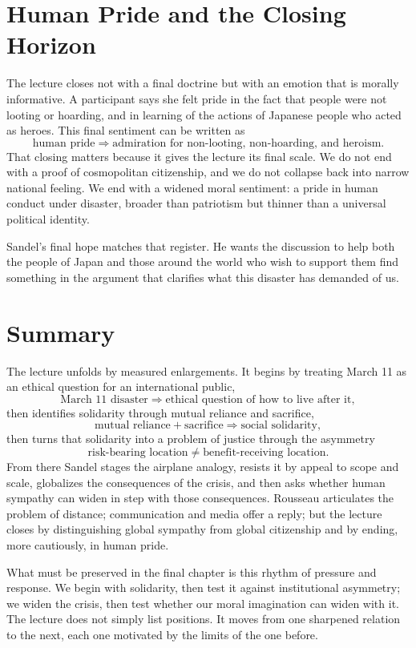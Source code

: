 \section{Human Pride and the Closing Horizon}

The lecture closes not with a final doctrine but with an emotion that is morally informative. A participant says she felt pride in the fact that people were not looting or hoarding, and in learning of the actions of Japanese people who acted as heroes. This final sentiment can be written as
\begin{equation}
\text{human pride}
\Longrightarrow
\text{admiration for non-looting, non-hoarding, and heroism}.
\end{equation}
That closing matters because it gives the lecture its final scale. We do not end with a proof of cosmopolitan citizenship, and we do not collapse back into narrow national feeling. We end with a widened moral sentiment: a pride in human conduct under disaster, broader than patriotism but thinner than a universal political identity.

Sandel's final hope matches that register. He wants the discussion to help both the people of Japan and those around the world who wish to support them find something in the argument that clarifies what this disaster has demanded of us.

\section{Summary}

The lecture unfolds by measured enlargements. It begins by treating March 11 as an ethical question for an international public,
\begin{equation}
\text{March 11 disaster}
\Longrightarrow
\text{ethical question of how to live after it},
\end{equation}
then identifies solidarity through mutual reliance and sacrifice,
\begin{equation}
\text{mutual reliance} + \text{sacrifice}
\Longrightarrow
\text{social solidarity},
\end{equation}
then turns that solidarity into a problem of justice through the asymmetry
\begin{equation}
\text{risk-bearing location}
\neq
\text{benefit-receiving location}.
\end{equation}
From there Sandel stages the airplane analogy, resists it by appeal to scope and scale, globalizes the consequences of the crisis, and then asks whether human sympathy can widen in step with those consequences. Rousseau articulates the problem of distance; communication and media offer a reply; but the lecture closes by distinguishing global sympathy from global citizenship and by ending, more cautiously, in human pride.

What must be preserved in the final chapter is this rhythm of pressure and response. We begin with solidarity, then test it against institutional asymmetry; we widen the crisis, then test whether our moral imagination can widen with it. The lecture does not simply list positions. It moves from one sharpened relation to the next, each one motivated by the limits of the one before.